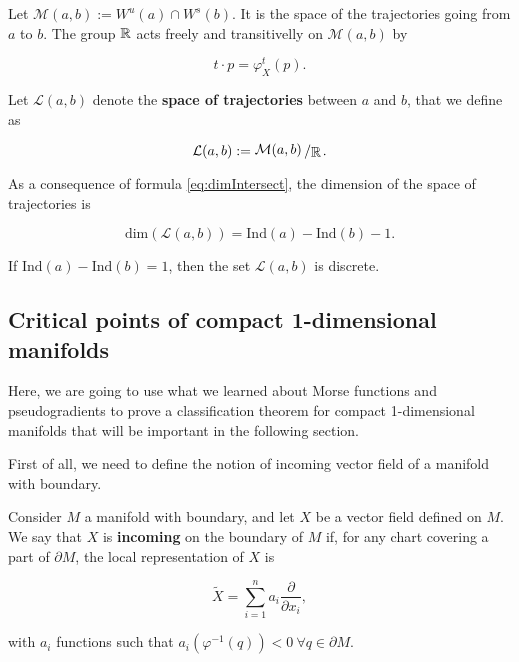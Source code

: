 Let $\mathcal{M}(a,b) := W^u(a) \cap W^s(b)$. It is the space of the trajectories going from $a$ to $b$. The group $\mathbb{R}$ acts freely and transitivelly on $\mathcal{M}(a,b)$ by

\begin{displaymath}
t \cdot p = \varphi_X^t(p) .
\end{displaymath}

\begin{deff}
Let $\mathcal{L}(a,b)$ denote the {\bf space of trajectories} between $a$ and $b$, that we define as

\begin{displaymath}
\mathcal{L}(a,b) := \quocient{\mathcal{M}(a,b)}{\R} .
\end{displaymath}
\end{deff}

\begin{rmrk}
As a consequence of formula \ref{eq:dimIntersect}, the dimension of the space of trajectories is

\begin{displaymath}
\text{dim}(\mathcal{L}(a,b)) = \text{Ind}(a) - \text{Ind}(b) - 1 .
\end{displaymath}
\end{rmrk}

\begin{coro}
If $\text{Ind}(a)-\text{Ind}(b) = 1$, then the set $\mathcal{L}(a,b)$ is discrete.
\end{coro}

\subsection{Critical points of compact 1-dimensional manifolds}

Here, we are going to use what we learned about Morse functions and pseudogradients to prove a classification theorem for compact 1-dimensional manifolds that will be important in the following section.

First of all, we need to define the notion of incoming vector field of a manifold with boundary.

\begin{deff}
Consider $M$ a manifold with boundary, and let $X$ be a vector field defined on $M$. We say that $X$ is {\bf incoming} on the boundary of $M$ if, for any chart covering a part of $\partial M$, the local representation of $X$ is

$$\tilde{X} = \sum_{i=1}^n a_i \frac{\partial}{\partial x_i} ,$$

with $a_i$ functions such that $a_i(\varphi^{-1}(q)) < 0 \ \forall q \in \partial M$.
\end{deff}

